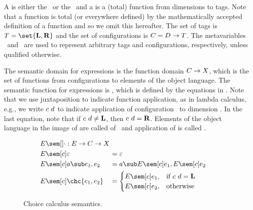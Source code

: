 A  is either the  \tagL\ or the  \tagR\ and a  is a (total) function from dimensions to tags.
Note that a function is total (or everywhere defined) by the mathematically accepted definition of a function and so we omit this hereafter.
The set of tags is $\tagS = \set{\tagL, \tagR}$ and the set of configurations is $\color{black}C = \color{black}D \to \color{black}T$.
The metavariables \tagE\ and \cE\ are used to represent arbitrary tags and configurations, respectively, unless qualified otherwise.

The semantic domain for expressions is the function domain $\color{black}C \to \color{black}X$, which is the set of functions from configurations to elements of the object language.
The semantic function for expressions is \ccSem{\cdot}, which is defined by the equations in .
Note that we use juxtaposition to indicate function application, as in lambda calculus, e.g., we write $\color{black}c\ \color{black}d$ to indicate application of configuration \cE\ to dimension \dE.
In the last equation, note that if $\color{black}c\ \color{black}d \ne \color{black}\mathbf{L}$, then $\color{black}c\ \color{black}d = \color{black}\mathbf{R}$.
Elements of the object language in the image of \ccSem{\ccE} are called  of \ccE\ and application of \ccSem{\ccE} is called .

\begin{figure}[H]
  \onehalfspacing
  \begin{alignat*}{2}
    \mathrlap{\ccSem{\cdot} : \ccS \to \cS \to \objS} \\
    &\ccSem[\cE]{\objEmpty} &&= \objEmpty \\
    &\ccSem[\cE]{\tr{\ccE_1, \ccE_2}} &&=
    \tr{\ccSem[\cE]{\ccE_1}, \ccSem[\cE]{\ccE_2}} \\
    &\ccSem[\cE]{\chc{\ccE_1, \ccE_2}} &&=
    \begin{cases}
      \ccSem[\cE]{\ccE_1}, & \text{if }\cE\ \dE = \tagL \\
      \ccSem[\cE]{\ccE_2}, & \text{otherwise}%
    \end{cases}
  \end{alignat*}
  \caption{Choice calculus semantics.}
  \label{fig:ccsem}
\end{figure}

